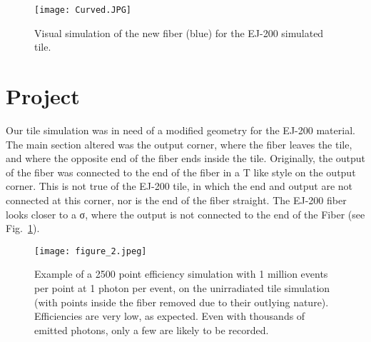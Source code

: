 \begin{figure}[h!]
  \begin{center}
    \texttt{[image: Curved.JPG]}
    \caption{Visual simulation of the new fiber (blue) for the EJ-200 simulated tile.}
    \label{fig:1}
  \end{center}
\end{figure}

\section{Project}
	Our tile simulation was in need of a modified geometry for the EJ-200 material. The main section altered was the output corner, where the fiber leaves the tile, and where the opposite end of the fiber ends inside the tile. Originally, the output of the fiber was connected to the end of the fiber in a T like style on the output corner. This is not true of the EJ-200 tile, in which the end and output are not connected at this corner, nor is the end of the fiber straight. The EJ-200 fiber looks closer to a σ, where the output is not connected to the end of the Fiber (see Fig.~\ref{fig:1}). 

\begin{figure}[h!]
  \begin{center}
    \texttt{[image: figure\_2.jpeg]}
    \caption{Example of a 2500 point efficiency simulation with 1 million events per point at 1 photon per event, on the unirradiated tile simulation (with points inside the fiber removed due to their outlying nature). Efficiencies are very low, as expected. Even with thousands of emitted photons, only a few are likely to be recorded.}
    \label{fig:2}
  \end{center}
\end{figure}

